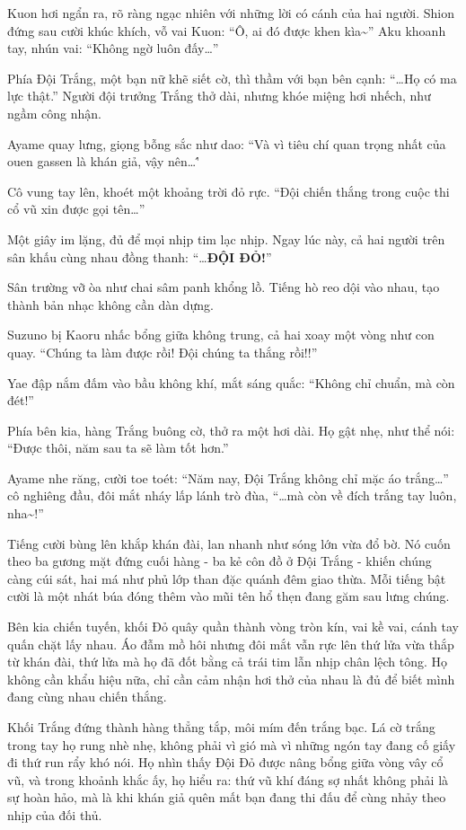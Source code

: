 \documentclass[../main.tex]{subfiles}
\begin{document}
Kuon hơi ngẩn ra, rõ ràng ngạc nhiên với những lời có cánh của hai người. Shion đứng sau cười khúc khích, vỗ vai Kuon: ``Ô, ai đó được khen kìa\~{}'' Aku khoanh tay, nhún vai:  ``Không ngờ luôn đấy\dots''

Phía Đội Trắng, một bạn nữ khẽ siết cờ, thì thầm với bạn bên cạnh: ``\dots Họ có ma lực thật.'' Người đội trưởng Trắng thở dài, nhưng khóe miệng hơi nhếch, như ngầm công nhận.

Ayame quay lưng, giọng bỗng sắc như dao: ``Và vì tiêu chí quan trọng nhất của ouen gassen là khán giả, vậy nên\dots\''

Cô vung tay lên, khoét một khoảng trời đỏ rực.
``Đội chiến thắng trong cuộc thi cổ vũ xin được gọi tên\dots''

Một giây im lặng, đủ để mọi nhịp tim lạc nhịp. Ngay lúc này, cả hai người trên sân khấu cùng nhau đồng thanh: ``\dots \textbf{ĐỘI ĐỎ!}''

Sân trường vỡ òa như chai sâm panh khổng lồ. Tiếng hò reo dội vào nhau, tạo thành bản nhạc không cần dàn dựng.

Suzuno bị Kaoru nhấc bổng giữa không trung, cả hai xoay một vòng như con quay.
``Chúng ta làm được rồi! Đội chúng ta thắng rồi!!''

Yae đập nắm đấm vào bầu không khí, mắt sáng quắc: ``Không chỉ chuẩn, mà còn đét!''

Phía bên kia, hàng Trắng buông cờ, thở ra một hơi dài. Họ gật nhẹ, như thể nói: ``Được thôi, năm sau ta sẽ làm tốt hơn.''

Ayame nhe răng, cười toe toét: ``Năm nay, Đội Trắng không chỉ mặc áo trắng\dots'' cô nghiêng đầu, đôi mắt nháy lấp lánh trò đùa, ``\dots mà còn về đích trắng tay luôn, nha\~{}!''

Tiếng cười bùng lên khắp khán đài, lan nhanh như sóng lớn vừa đổ bờ. Nó cuốn theo ba gương mặt đứng cuối hàng - ba kẻ côn đồ ở Đội Trắng - khiến chúng càng cúi sát, hai má như phủ lớp than đặc quánh đêm giao thừa. Mỗi tiếng bật cười là một nhát búa đóng thêm vào mũi tên hổ thẹn đang găm sau lưng chúng.

Bên kia chiến tuyến, khối Đỏ quây quần thành vòng tròn kín, vai kề vai, cánh tay quấn chặt lấy nhau. Áo đẫm mồ hôi nhưng đôi mắt vẫn rực lên thứ lửa vừa thắp từ khán đài, thứ lửa mà họ đã đốt bằng cả trái tim lẫn nhịp chân lệch tông. Họ không cần khẩu hiệu nữa, chỉ cần cảm nhận hơi thở của nhau là đủ để biết mình đang cùng nhau chiến thắng.

Khối Trắng đứng thành hàng thẳng tắp, môi mím đến trắng bạc. Lá cờ trắng trong tay họ rung nhè nhẹ, không phải vì gió mà vì những ngón tay đang cố giấy đi thứ run rẩy khó nói. Họ nhìn thấy Đội Đỏ được nâng bổng giữa vòng vây cổ vũ, và trong khoảnh khắc ấy, họ hiểu ra: thứ vũ khí đáng sợ nhất không phải là sự hoàn hảo, mà là khi khán giả quên mất bạn đang thi đấu để cùng nhảy theo nhịp của đối thủ.
\end{document}
